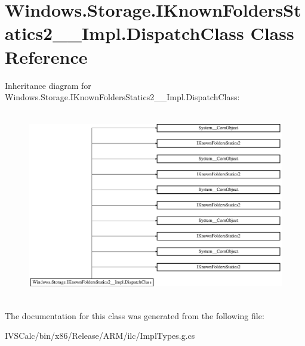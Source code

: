 \hypertarget{class_windows_1_1_storage_1_1_i_known_folders_statics2_____impl_1_1_dispatch_class}{}\section{Windows.\+Storage.\+I\+Known\+Folders\+Statics2\+\_\+\+\_\+\+Impl.\+Dispatch\+Class Class Reference}
\label{class_windows_1_1_storage_1_1_i_known_folders_statics2_____impl_1_1_dispatch_class}
Inheritance diagram for Windows.\+Storage.\+I\+Known\+Folders\+Statics2\+\_\+\+\_\+\+Impl.\+Dispatch\+Class\+:\begin{figure}[H]
\begin{center}
\leavevmode
\includegraphics[height=8.324325cm]{class_windows_1_1_storage_1_1_i_known_folders_statics2_____impl_1_1_dispatch_class}
\end{center}
\end{figure}


The documentation for this class was generated from the following file\+:\begin{DoxyCompactItemize}
\item 
I\+V\+S\+Calc/bin/x86/\+Release/\+A\+R\+M/ilc/Impl\+Types.\+g.\+cs\end{DoxyCompactItemize}
